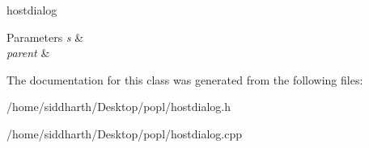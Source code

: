 hostdialog 


\begin{DoxyParams}{Parameters}
{\em s} & \\
\hline
{\em parent} & \\
\hline
\end{DoxyParams}


The documentation for this class was generated from the following files\+:\begin{DoxyCompactItemize}
\item 
/home/siddharth/\+Desktop/popl/hostdialog.\+h\item 
/home/siddharth/\+Desktop/popl/hostdialog.\+cpp\end{DoxyCompactItemize}
